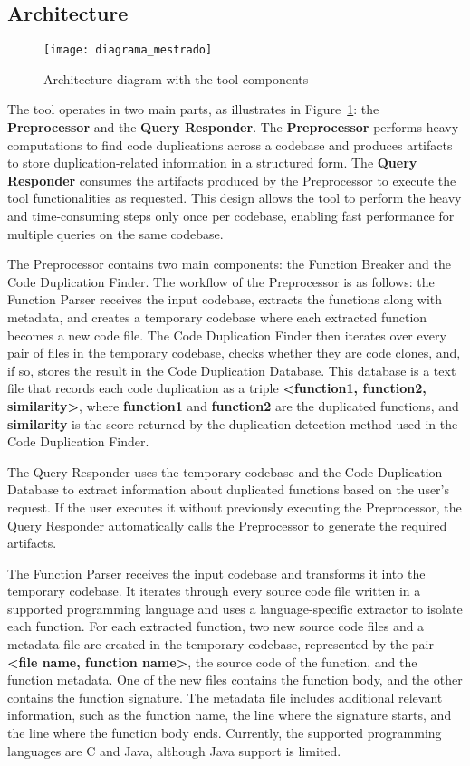 \documentclass[conference]{IEEEtran}
\begin{document}
\subsection{Architecture}

\begin{figure}[!t]
\centering
\texttt{[image: diagrama\_mestrado]}
\caption{Architecture diagram with the tool components}
\label{fig:diagram}
\end{figure}

The tool operates in two main parts, as illustrates in Figure~\ref{fig:diagram}: the \textbf{Preprocessor} and the \textbf{Query Responder}. 
The \textbf{Preprocessor} performs heavy computations to find code 
duplications across a codebase and produces artifacts to store duplication-related information 
in a structured form. The \textbf{Query Responder} consumes the artifacts produced 
by the Preprocessor to execute the tool functionalities as requested. This design allows the 
tool to perform the heavy and time-consuming steps only once per codebase, enabling fast performance 
for multiple queries on the same codebase.

The Preprocessor contains two main components: the Function Breaker and the Code Duplication Finder. 
The workflow of the Preprocessor is as follows: the Function Parser receives the input codebase,
extracts the functions along with metadata, and creates a temporary codebase where each extracted 
function becomes a new code file. The Code Duplication Finder then iterates over every pair of files 
in the temporary codebase, checks whether they are code clones, and, if so, stores the result in 
the Code Duplication Database. This database is a text file that records each code duplication as a triple 
\textbf{<function1, function2, similarity>}, where \textbf{function1} and \textbf{function2} are the 
duplicated functions, and \textbf{similarity} is the score returned by the duplication detection method 
used in the Code Duplication Finder.

The Query Responder uses the temporary codebase and the Code Duplication Database to extract 
information about duplicated functions based on the user's request. If the user executes it
without previously executing the Preprocessor, the Query Responder automatically 
calls the Preprocessor to generate the required artifacts.

The Function Parser receives the input codebase and transforms it into the temporary
codebase. It iterates through every source code file written in a supported programming 
language and uses a language-specific extractor to isolate each function. For each extracted 
function, two new source code files and a metadata file are created in the temporary codebase, 
represented by the pair \textbf{<file name, function name>}, the source code of the function, 
and the function metadata. One of the new files contains the function body, and the other 
contains the function signature. The metadata file includes additional relevant information,
such as the function name, the line where the signature starts, and the line where the function 
body ends. Currently, the supported programming languages are C and Java, although Java support is limited.
\end{document}

